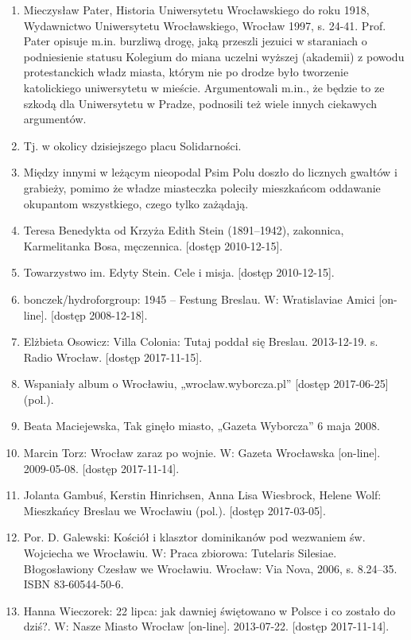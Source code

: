 \documentclass{article}
\begin{document}
\begin{enumerate}
\item Mieczysław Pater, Historia Uniwersytetu Wrocławskiego do roku 1918, Wydawnictwo Uniwersytetu Wrocławskiego, Wrocław 1997, s. 24-41. Prof. Pater opisuje m.in. burzliwą drogę, jaką przeszli jezuici w staraniach o podniesienie statusu Kolegium do miana uczelni wyższej (akademii) z powodu protestanckich władz miasta, którym nie po drodze było tworzenie katolickiego uniwersytetu w mieście. Argumentowali m.in., że będzie to ze szkodą dla Uniwersytetu w Pradze, podnosili też wiele innych ciekawych argumentów.\label{13}
\item  Tj. w okolicy dzisiejszego placu Solidarności.\label{14}
\item Między innymi w leżącym nieopodal Psim Polu doszło do licznych gwałtów i grabieży, pomimo że władze miasteczka poleciły mieszkańcom oddawanie okupantom wszystkiego, czego tylko zażądają.\label{15}
\item  Teresa Benedykta od Krzyża Edith Stein (1891–1942), zakonnica, Karmelitanka Bosa, męczennica. [dostęp 2010-12-15].\label{16}
\item  Towarzystwo im. Edyty Stein. Cele i misja. [dostęp 2010-12-15].\label{17}
\item bonczek/hydroforgroup: 1945 – Festung Breslau. W: Wratislaviae Amici [on-line]. [dostęp 2008-12-18].\label{18}
\item Elżbieta Osowicz: Villa Colonia: Tutaj poddał się Breslau. 2013-12-19. s. Radio Wrocław. [dostęp 2017-11-15].\label{19}
\item  Wspaniały album o Wrocławiu, „wroclaw.wyborcza.pl” [dostęp 2017-06-25] (pol.).\label{20}
\item  Beata Maciejewska, Tak ginęło miasto, „Gazeta Wyborcza” 6 maja 2008.\label{21}
\item Marcin Torz: Wrocław zaraz po wojnie. W: Gazeta Wrocławska [on-line]. 2009-05-08. [dostęp 2017-11-14].\label{22}
\item Jolanta Gambuś, Kerstin Hinrichsen, Anna Lisa Wiesbrock, Helene Wolf: Mieszkańcy Breslau we Wrocławiu (pol.). [dostęp 2017-03-05].\label{23}
\item Por. D. Galewski: Kościół i klasztor dominikanów pod wezwaniem św. Wojciecha we Wrocławiu. W: Praca zbiorowa: Tutelaris Silesiae. Błogosławiony Czesław we Wrocławiu. Wrocław: Via Nova, 2006, s. 8.24–35. ISBN 83-60544-50-6.\label{24}
\item Hanna Wieczorek: 22 lipca: jak dawniej świętowano w Polsce i co zostało do dziś?. W: Nasze Miasto Wrocław [on-line]. 2013-07-22. [dostęp 2017-11-14].\label{25}

\end{enumerate}
\end{document}
